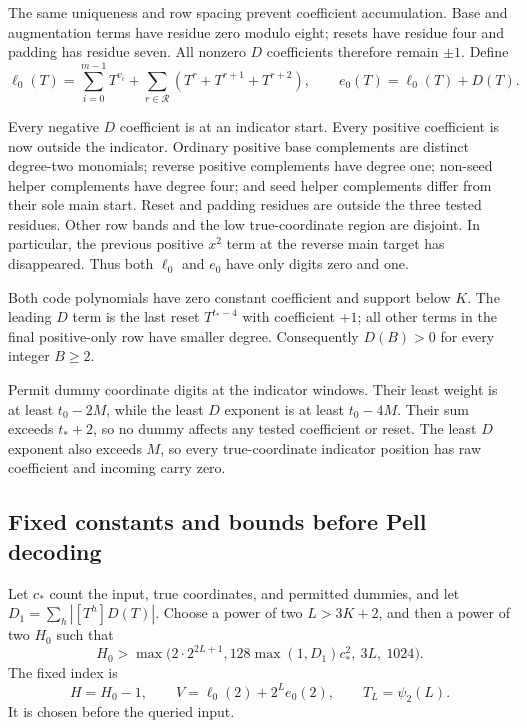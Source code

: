 The same uniqueness and row spacing prevent coefficient accumulation.
Base and augmentation terms have residue zero modulo eight; resets
have residue four and padding has residue seven. All nonzero $D$
coefficients therefore remain $\pm1$. Define
\begin{equation}\label{eq:binary-product-codes}
 \ell_0(T)=\sum_{i=0}^{m-1}T^{v_i}
     +\sum_{r\in\mathcal R}(T^r+T^{r+1}+T^{r+2}),
 \qquad e_0(T)=\ell_0(T)+D(T).
\end{equation}

Every negative $D$ coefficient is at an indicator start. Every
positive coefficient is now outside the indicator. Ordinary positive
base complements are distinct degree-two monomials; reverse positive
complements have degree one; non-seed helper complements have degree
four; and seed helper complements differ from their sole main start.
Reset and padding residues are outside the three tested residues.
Other row bands and the low true-coordinate region are disjoint.
In particular, the previous positive $x^2$ term at the reverse main
target has disappeared. Thus both $\ell_0$ and $e_0$ have only
digits zero and one.

Both code polynomials have zero constant coefficient and support below
$K$. The leading $D$ term is the last reset $T^{t_*-4}$ with coefficient
$+1$; all other terms in the final positive-only row have smaller degree.
Consequently $D(B)>0$ for every integer $B\ge2$.

Permit dummy coordinate digits at the indicator windows. Their least
weight is at least $t_0-2M$, while the least $D$ exponent is at least
$t_0-4M$. Their sum exceeds $t_*+2$, so no dummy affects any tested
coefficient or reset. The least $D$ exponent also exceeds $M$, so
every true-coordinate indicator position has raw coefficient and
incoming carry zero.

\subsection{Fixed constants and bounds before Pell decoding}

Let $c_*$ count the input, true coordinates, and permitted dummies,
and let $D_1=\sum_h|[T^h]D(T)|$. Choose a power of two $L>3K+2$,
and then a power of two $H_0$ such that
\begin{equation}\label{eq:binary-product-threshold}
 H_0>\max\bigl(2\cdot2^{2L+1},
       128\max(1,D_1)c_*^2,\ 3L,\ 1024\bigr).
\end{equation}
The fixed index is
\begin{equation}\label{eq:binary-product-index}
 H=H_0-1,\qquad V=\ell_0(2)+2^Le_0(2),\qquad
 T_L=\psi_2(L).
\end{equation}
It is chosen before the queried input.

